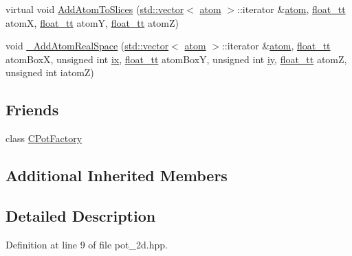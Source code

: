 \begin{DoxyCompactItemize}
\item 
virtual void \hyperlink{class_q_s_t_e_m_1_1_c2_d_potential_a2fca40fd401de121e552321476bf8d12}{Add\-Atom\-To\-Slices} (\hyperlink{qmb_8m_af54b69a32590de218622e869b06b47b3}{std\-::vector}$<$ \hyperlink{namespace_q_s_t_e_m_a402dabc31a7a1fe906d0cdd138c69686}{atom} $>$\-::iterator \&\hyperlink{namespace_q_s_t_e_m_a402dabc31a7a1fe906d0cdd138c69686}{atom}, \hyperlink{namespace_q_s_t_e_m_a915d7caa497280d9f927c4ce8d330e47}{float\-\_\-tt} atom\-X, \hyperlink{namespace_q_s_t_e_m_a915d7caa497280d9f927c4ce8d330e47}{float\-\_\-tt} atom\-Y, \hyperlink{namespace_q_s_t_e_m_a915d7caa497280d9f927c4ce8d330e47}{float\-\_\-tt} atom\-Z)
\item 
void \hyperlink{class_q_s_t_e_m_1_1_c2_d_potential_a6e01a70ac1a5864bd67b4b0560c3a00a}{\-\_\-\-Add\-Atom\-Real\-Space} (\hyperlink{qmb_8m_af54b69a32590de218622e869b06b47b3}{std\-::vector}$<$ \hyperlink{namespace_q_s_t_e_m_a402dabc31a7a1fe906d0cdd138c69686}{atom} $>$\-::iterator \&\hyperlink{namespace_q_s_t_e_m_a402dabc31a7a1fe906d0cdd138c69686}{atom}, \hyperlink{namespace_q_s_t_e_m_a915d7caa497280d9f927c4ce8d330e47}{float\-\_\-tt} atom\-Box\-X, unsigned int \hyperlink{_display_model_properties_8m_a76b405b72b88bde9488209ac06ddb714}{ix}, \hyperlink{namespace_q_s_t_e_m_a915d7caa497280d9f927c4ce8d330e47}{float\-\_\-tt} atom\-Box\-Y, unsigned int \hyperlink{_display_model_properties_8m_af4c5cec9fce175f73b7da5ecd33c2af6}{iy}, \hyperlink{namespace_q_s_t_e_m_a915d7caa497280d9f927c4ce8d330e47}{float\-\_\-tt} atom\-Z, unsigned int iatom\-Z)
\end{DoxyCompactItemize}
\subsection*{Friends}
\begin{DoxyCompactItemize}
\item 
class \hyperlink{class_q_s_t_e_m_1_1_c2_d_potential_a6759f7ccac4d3744ec78fd194903e752}{C\-Pot\-Factory}
\end{DoxyCompactItemize}
\subsection*{Additional Inherited Members}


\subsection{Detailed Description}


Definition at line 9 of file pot\-\_\-2d.\-hpp.



